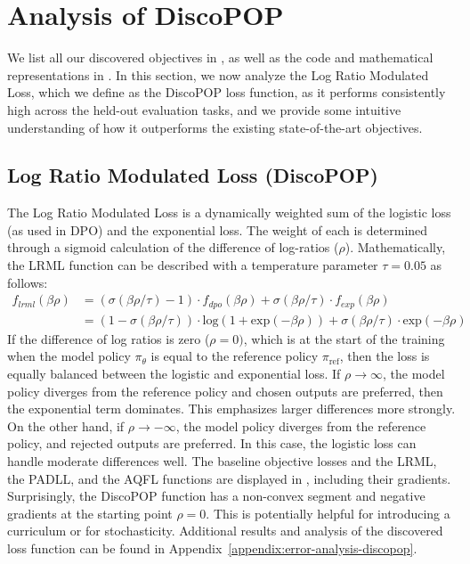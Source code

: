 \documentclass{article}
\theoremstyle{plain}
\theoremstyle{definition}
\theoremstyle{remark}
\begin{document}
\section{Analysis of DiscoPOP}
\label{analysis}
We list all our discovered objectives in , as well as the code and mathematical representations in . In this section, we now analyze the Log Ratio Modulated Loss, which we define as the DiscoPOP loss function, as it performs consistently high across the held-out evaluation tasks, and we provide some intuitive understanding of how it outperforms the existing state-of-the-art objectives.

\subsection{Log Ratio Modulated Loss (DiscoPOP)}
The Log Ratio Modulated Loss is a dynamically weighted sum of the logistic loss (as used in DPO) and the exponential loss. The weight of each is determined through a sigmoid calculation of the difference of log-ratios ($\rho$). Mathematically, the LRML function can be described with a temperature parameter $\tau = 0.05$ as follows:
\begin{align}
f_{lrml}(\beta\rho) &= (\sigma(\beta\rho/\tau)-1)\cdot f_{dpo}(\beta\rho) + \sigma(\beta\rho/\tau)\cdot f_{exp}(\beta\rho) \\
&= (1-\sigma(\beta\rho/\tau))\cdot \text{log}(1+\text{exp}(-\beta\rho)) + \sigma(\beta\rho/\tau)\cdot \text{exp}(-\beta\rho)
\end{align}
If the difference of log ratios is zero ($\rho = 0)$, which is at the start of the training when the model policy $\pi_{\theta}$ is equal to the reference policy $\pi_{\text{ref}}$, then the loss is equally balanced between the logistic and exponential loss. If $\rho \rightarrow 	\infty$, the model policy diverges from the reference policy and chosen outputs are preferred, then the exponential term dominates. This emphasizes larger differences more strongly. On the other hand, if  $\rho \rightarrow -\infty$, the model policy diverges from the reference policy, and rejected outputs are preferred. In this case, the logistic loss can handle moderate differences well. The baseline objective losses and the LRML, the PADLL, and the AQFL functions are displayed in , including their gradients. Surprisingly, the DiscoPOP function has a non-convex segment and negative gradients at the starting point $\rho = 0$. This is potentially helpful for introducing a curriculum or for stochasticity. Additional results and analysis of the discovered loss function can be found in Appendix~\ref{appendix:error-analysis-discopop}.
\end{document}
